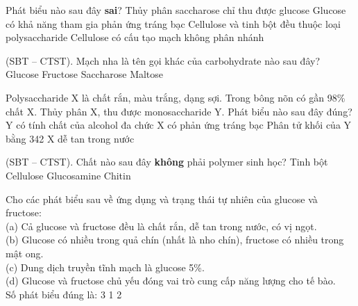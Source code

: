 \documentclass[12pt,a4paper]{article}
\begin{document}
\begin{ex}
Phát biểu nào sau đây \textbf{sai}?
\choice
{\True Thủy phân saccharose chỉ thu được glucose}
{Glucose có khả năng tham gia phản ứng tráng bạc}
{Cellulose và tinh bột đều thuộc loại polysaccharide}
{Cellulose có cấu tạo mạch không phân nhánh}
\end{ex}

\begin{ex}
(SBT -- CTST). Mạch nha là tên gọi khác của carbohydrate nào sau đây?
\choice
{Glucose}
{Fructose}
{Saccharose}
{\True Maltose}
\end{ex}

\begin{ex}
Polysaccharide X là chất rắn, màu trắng, dạng sợi. Trong bông nõn có gần 98\% chất X. Thủy phân X, thu được monosaccharide Y. Phát biểu nào sau đây đúng?
\choice
{\True Y có tính chất của alcohol đa chức}
{X có phản ứng tráng bạc}
{Phân tử khối của Y bằng 342}
{X dễ tan trong nước}
\end{ex}

\begin{ex}
(SBT -- CTST). Chất nào sau đây \textbf{không} phải polymer sinh học?
\choice
{Tinh bột}
{Cellulose}
{\True Glucosamine}
{Chitin}
\end{ex}

\begin{ex}
Cho các phát biểu sau về ứng dụng và trạng thái tự nhiên của glucose và fructose:\\
(a) Cả glucose và fructose đều là chất rắn, dễ tan trong nước, có vị ngọt.\\
(b) Glucose có nhiều trong quả chín (nhất là nho chín), fructose có nhiều trong mật ong.\\
(c) Dung dịch truyền tĩnh mạch là glucose 5\%.\\
(d) Glucose và fructose chủ yếu đóng vai trò cung cấp năng lượng cho tế bào.\\
Số phát biểu đúng là:
\choice
{3}
{}
{1}
{2}
\end{ex}
\end{document}
